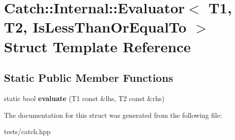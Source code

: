 \hypertarget{struct_catch_1_1_internal_1_1_evaluator_3_01_t1_00_01_t2_00_01_is_less_than_or_equal_to_01_4}{}\section{Catch\+:\+:Internal\+:\+:Evaluator$<$ T1, T2, Is\+Less\+Than\+Or\+Equal\+To $>$ Struct Template Reference}
\label{struct_catch_1_1_internal_1_1_evaluator_3_01_t1_00_01_t2_00_01_is_less_than_or_equal_to_01_4}
\subsection*{Static Public Member Functions}
\begin{DoxyCompactItemize}
\item 
\mbox{\label{struct_catch_1_1_internal_1_1_evaluator_3_01_t1_00_01_t2_00_01_is_less_than_or_equal_to_01_4_adf269a597e4d82d69f29bcb516297b9b}} 
static bool {\bfseries evaluate} (T1 const \&lhs, T2 const \&rhs)
\end{DoxyCompactItemize}


The documentation for this struct was generated from the following file\+:\begin{DoxyCompactItemize}
\item 
tests/catch.\+hpp\end{DoxyCompactItemize}
